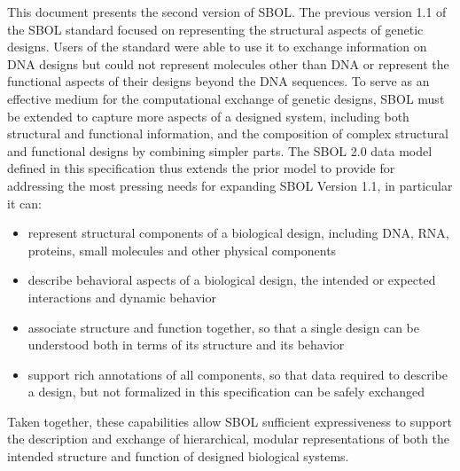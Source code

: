 This document presents the second version of SBOL.
The previous version 1.1 of the SBOL standard focused on representing the structural aspects of genetic designs. 
Users of the standard were able to use it to exchange information on DNA designs but could not represent molecules other than DNA or represent the functional aspects of their designs beyond the DNA sequences. 
To serve as an effective medium for the computational exchange of genetic designs, SBOL must be extended to capture more aspects of a designed system, including both structural and functional information, and the composition of complex structural and functional designs by combining simpler parts. 
The SBOL 2.0 data model defined in this specification thus extends the prior model to provide for addressing the most pressing needs for expanding SBOL Version 1.1, in particular it can:
\begin{itemize}

\item represent structural components of a biological design, including DNA, RNA, proteins, small molecules and other physical components

\item describe behavioral aspects of a biological design, the intended or expected interactions and dynamic behavior

\item associate structure and function together, so that a single design can be understood both in terms of its structure and its behavior

\item support rich annotations of all components, so that data required to describe a design, but not formalized in this specification can be safely exchanged

\end{itemize}
Taken together, these capabilities allow SBOL sufficient expressiveness to support the description and exchange of hierarchical, modular representations of both the intended structure and function of designed biological systems.

